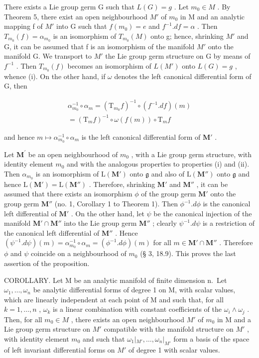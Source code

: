 There exists a Lie group germ G such that \(L(G) = g\) . Let \(m_{0} \in M\) . By Theorem 5, there exist an open neighbourhood \(M'\) of \(m_{0}\) in M and an analytic mapping f of \(M'\) into G such that \(f(m_{0}) = e\) and \(f^{-1}.df = \alpha\) . Then \(T_{m_{0}}(f) = \alpha_{m_{0}}\) is an isomorphism of \(T_{m_{0}}(M)\) onto g; hence, shrinking \(M'\) and G, it can be assumed that f is an isomorphism of the manifold \(M'\) onto the manifold G. We transport to \(M'\) the Lie group germ structure on G by means of \(f^{-1}\) . Then \(T_{m_{0}}(f)\) becomes an isomorphism of \(L(M')\) onto \(L(G) = g\) , whence (i). On the other hand, if \(\omega\) denotes the left canonical differential form of G, then

\[
\begin{array}{r} \alpha_ {m _ {0}} ^ {- 1} \circ \alpha_ {m} = (\mathrm{T} _ {m _ {0}} f) ^ {- 1} \circ (f ^ {- 1}. d f) (m) \\ = (\mathrm{T} _ {m} f) ^ {- 1} \circ \omega (f (m)) \circ \mathrm{T} _ {m} f \end{array}
\]

and hence \(m \mapsto \alpha_{m_0}^{-1} \circ \alpha_m\) is the left canonical differential form of \(\mathbf{M}'\) .

Let \(\mathbf{M}^{\prime}\) be an open neighbourhood of \(m_0\) , with a Lie group germ structure, with identity element \(m_0\) and with the analogous properties to properties (i) and (ii). Then \(\alpha_{m_0}\) is an isomorphism of \(\mathrm{L}(\mathbf{M}')\) onto \(\mathfrak{g}\) and also of \(\mathrm{L}(\mathbf{M}'')\) onto \(\mathfrak{g}\) and hence \(\mathrm{L}(\mathbf{M}') = \mathrm{L}(\mathbf{M}'')\) . Therefore, shrinking \(\mathbf{M}'\) and \(\mathbf{M}''\) , it can be assumed that there exists an isomorphism \(\phi\) of the group germ \(\mathbf{M}'\) onto the group germ \(\mathbf{M}''\) (no. 1, Corollary 1 to Theorem 1). Then \(\phi^{-1}.d\phi\) is the canonical left differential of \(\mathbf{M}'\) . On the other hand, let \(\psi\) be the canonical injection of the manifold \(\mathbf{M}' \cap \mathbf{M}''\) into the Lie group germ \(\mathbf{M}''\) ; clearly \(\psi^{-1}.d\psi\) is a restriction of the canonical left differential of \(\mathbf{M}''\) . Hence \((\psi^{-1}.d\psi)(m) = \alpha_{m_0}^{-1} \circ \alpha_m = (\phi^{-1}.d\phi)(m)\) for all \(m \in \mathbf{M}' \cap \mathbf{M}''\) . Therefore \(\phi\) and \(\psi\) coincide on a neighbourhood of \(m_0\) (§ 3, 18.9). This proves the last assertion of the proposition.

COROLLARY. Let M be an analytic manifold of finite dimension n.~Let \(\omega_{1},\ldots,\omega_{n}\) be analytic differential forms of degree 1 on M, with scalar values, which are linearly independent at each point of M and such that, for all \(k=1,\ldots,n\) , \(\omega_{k}\) is a linear combination with constant coefficients of the \(\omega_{i}\wedge\omega_{j}\) . Then, for all \(m_{0}\in M\) , there exists an open neighbourhood \(M'\) of \(m_{0}\) in M and a Lie group germ structure on \(M'\) compatible with the manifold structure on \(M'\) , with identity element \(m_{0}\) and such that \(\omega_{1}|_{M'},\ldots,\omega_{n}|_{M'}\) form a basis of the space of left invariant differential forms on \(M'\) of degree 1 with scalar values.

